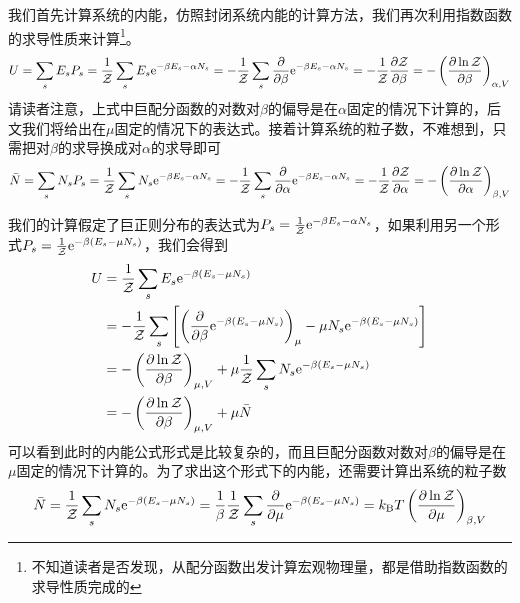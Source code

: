 \documentclass[../../main.tex]{subfiles}
\begin{document}
我们首先计算系统的内能，仿照封闭系统内能的计算方法，我们再次利用指数函数的求导性质来计算\footnote{不知道读者是否发现，从配分函数出发计算宏观物理量，都是借助指数函数的求导性质完成的}。
\begin{equation}\label{eq:对称巨正则内能}
    U=\sum_s E_sP_s=\frac{1}{\mathcal{Z}}\sum_s E_s\mathrm{e}^{-\beta E_s-\alpha N_s}=-\frac{1}{\mathcal{Z}}\sum_s \pdv{\beta}\mathrm{e}^{-\beta E_s-\alpha N_s}=-\frac{1}{\mathcal{Z}}\pdv{\mathcal{Z}}{\beta}=-\left(\pdv{\ln\mathcal{Z}}{\beta}\right)_{\alpha,V}
\end{equation}
请读者注意，上式中巨配分函数的对数对\(\beta\)的偏导是在\(\alpha\)固定的情况下计算的，后文我们将给出在\(\mu\)固定的情况下的表达式。接着计算系统的粒子数，不难想到，只需把对\(\beta\)的求导换成对\(\alpha\)的求导即可
\begin{equation}\label{eq:对称巨正则粒子数}
    \bar{N}=\sum_s N_sP_s=\frac{1}{\mathcal{Z}}\sum_s N_s\mathrm{e}^{-\beta E_s-\alpha N_s}=-\frac{1}{\mathcal{Z}}\sum_s \pdv{\alpha}\mathrm{e}^{-\beta E_s-\alpha N_s}=-\frac{1}{\mathcal{Z}}\pdv{\mathcal{Z}}{\alpha}=-\left(\pdv{\ln\mathcal{Z}}{\alpha}\right)_{\beta,V}
\end{equation}

我们的计算假定了巨正则分布的表达式为\(P_s=\frac{1}{\mathcal{Z}}\mathrm{e}^{-\beta E_s-\alpha N_s}\)，如果利用另一个形式\(P_s=\frac{1}{\mathcal{Z}}\mathrm{e}^{-\beta (E_s-\mu N_s)}\)，我们会得到
\begin{equation}\label{eq:不对称巨正则内能}
    \begin{split}
        U&=\frac{1}{\mathcal{Z}}\sum_s E_s \mathrm{e}^{-\beta (E_s-\mu N_s)} \\
        &=-\frac{1}{\mathcal{Z}}\sum_s\left[\left(\pdv{\beta}\mathrm{e}^{-\beta (E_s-\mu N_s)}\right)_{\mu}-\mu N_s\mathrm{e}^{-\beta (E_s-\mu N_s)}\right] \\
        &=-\left(\pdv{\ln \mathcal{Z}}{\beta}\right)_{\mu,V}+\mu\frac{1}{\mathcal{Z}}\sum_s N_s\mathrm{e}^{-\beta (E_s-\mu N_s)} \\
        &=-\left(\pdv{\ln \mathcal{Z}}{\beta}\right)_{\mu,V}+\mu \bar{N}
    \end{split}
\end{equation}
可以看到此时的内能公式形式是比较复杂的，而且巨配分函数对数对\(\beta\)的偏导是在\(\mu\)固定的情况下计算的。为了求出这个形式下的内能，还需要计算出系统的粒子数
\begin{equation}\label{eq:不对称巨正则粒子数}
    \bar{N}=\frac{1}{\mathcal{Z}}\sum_s N_s\mathrm{e}^{-\beta (E_s-\mu N_s)}=\frac{1}{\beta}\frac{1}{\mathcal{Z}}\sum_s \pdv{\mu}\mathrm{e}^{-\beta (E_s-\mu N_s)}=k_{\mathrm{B}} T\left(\pdv{\ln\mathcal{Z}}{\mu}\right)_{\beta,V}
\end{equation}
\end{document}
